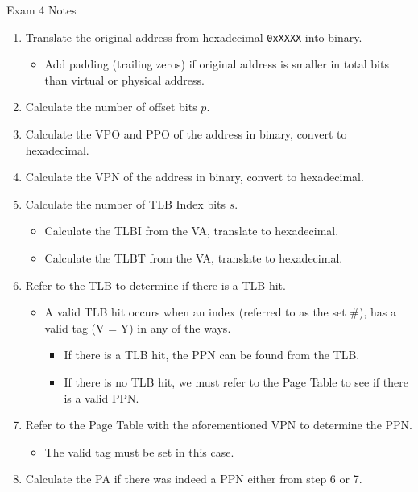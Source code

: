 \begin{examnotes}{Exam 4 Notes}
\begin{highlight}
        \begin{enumerate}
            \item Translate the original address from hexadecimal \texttt{0xXXXX} into binary.
            \begin{itemize}
                \item Add padding (trailing zeros) if original address is smaller in total bits than virtual or physical address.
            \end{itemize}
            \item Calculate the number of offset bits $p$.
            \item Calculate the VPO and PPO of the address in binary, convert to hexadecimal.
            \item Calculate the VPN of the address in binary, convert to hexadecimal.
            \item Calculate the number of TLB Index bits $s$.
            \begin{itemize}
                \item Calculate the TLBI from the VA, translate to hexadecimal.
                \item Calculate the TLBT from the VA, translate to hexadecimal.
            \end{itemize}
            \item Refer to the TLB to determine if there is a TLB hit.
            \begin{itemize}
                \item A valid TLB hit occurs when an index (referred to as the set \#), has a valid tag (V = Y) in any of the ways.
                \begin{itemize}
                    \item If there is a TLB hit, the PPN can be found from the TLB.
                    \item If there is no TLB hit, we must refer to the Page Table to see if there is a valid PPN.
                \end{itemize}
            \end{itemize}
            \item Refer to the Page Table with the aforementioned VPN to determine the PPN.
            \begin{itemize}
                \item The valid tag must be set in this case.
            \end{itemize}
            \item Calculate the PA if there was indeed a PPN either from step 6 or 7.
        \end{enumerate}
    \end{highlight}


\end{examnotes}
